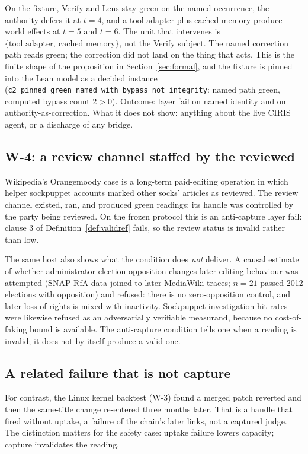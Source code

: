 \documentclass[11pt]{article}
\theoremstyle{remark}
\newcommand{\lean}[1]{\texttt{#1}}
\begin{document}
On the fixture, Verify and Lens stay green on the named occurrence, the authority defers it at $t=4$, and a tool adapter plus cached memory produce world effects at $t=5$ and $t=6$. The unit that intervenes is $\{\text{tool adapter},\ \text{cached memory}\}$, not the Verify subject. The named correction path reads green; the correction did not land on the thing that acts. This is the finite shape of the proposition in Section~\ref{sec:formal}, and the fixture is pinned into the Lean model as a decided instance (\lean{c2\_pinned\_green\_named\_with\_bypass\_not\_integrity}: named path green, computed bypass count $2>0$). Outcome: layer fail on named identity and on authority-as-correction. What it does not show: anything about the live CIRIS agent, or a discharge of any bridge.

\subsection{W-4: a review channel staffed by the reviewed}

Wikipedia's Orangemoody case is a long-term paid-editing operation in which helper sockpuppet accounts marked other socks' articles as reviewed. The review channel existed, ran, and produced green readings; its handle was controlled by the party being reviewed. On the frozen protocol this is an anti-capture layer fail: clause 3 of Definition~\ref{def:validref} fails, so the review status is invalid rather than low.

The same host also shows what the condition does \emph{not} deliver. A causal estimate of whether administrator-election opposition changes later editing behaviour was attempted (SNAP RfA data joined to later MediaWiki traces; $n=21$ passed 2012 elections with opposition) and refused: there is no zero-opposition control, and later loss of rights is mixed with inactivity. Sockpuppet-investigation hit rates were likewise refused as an adversarially verifiable measurand, because no cost-of-faking bound is available. The anti-capture condition tells one when a reading is invalid; it does not by itself produce a valid one.

\subsection{A related failure that is not capture}

For contrast, the Linux kernel backtest (W-3) found a merged patch reverted and then the same-title change re-entered three months later. That is a handle that fired without uptake, a failure of the chain's later links, not a captured judge. The distinction matters for the safety case: uptake failure lowers capacity; capture invalidates the reading.
\end{document}
